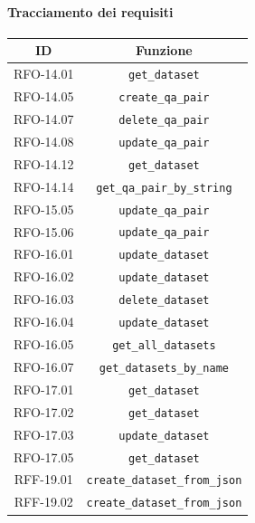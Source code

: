 \paragraph{Tracciamento dei requisiti}
\begin{tabularx}{\textwidth}{|c|c|}
    \hline
    \textbf{ID} & \textbf{Funzione} \\
    \hline
    RFO-14.01 & \texttt{get\_dataset}\\
    \hline
    RFO-14.05 & \texttt{create\_qa\_pair}\\
    \hline
    RFO-14.07 & \texttt{delete\_qa\_pair}\\
    \hline
    RFO-14.08 & \texttt{update\_qa\_pair}\\
    \hline
    RFO-14.12 & \texttt{get\_dataset}\\
    \hline
    RFO-14.14 & \texttt{get\_qa\_pair\_by\_string}\\
    \hline
    RFO-15.05 & \texttt{update\_qa\_pair}\\
    \hline
    RFO-15.06 & \texttt{update\_qa\_pair}\\
    \hline
    RFO-16.01 & \texttt{update\_dataset}\\
    \hline
    RFO-16.02 & \texttt{update\_dataset}\\
    \hline
    RFO-16.03 & \texttt{delete\_dataset}\\
    \hline
    RFO-16.04 & \texttt{update\_dataset}\\
    \hline
    RFO-16.05 & \texttt{get\_all\_datasets}\\
    \hline
    RFO-16.07 & \texttt{get\_datasets\_by\_name}\\
    \hline
    RFO-17.01 & \texttt{get\_dataset}\\
    \hline
    RFO-17.02 & \texttt{get\_dataset}\\
    \hline
    RFO-17.03 & \texttt{update\_dataset}\\
    \hline
    RFO-17.05 & \texttt{get\_dataset}\\
    \hline
    RFF-19.01 & \texttt{create\_dataset\_from\_json}\\
    \hline
    RFF-19.02 & \texttt{create\_dataset\_from\_json}\\
    \hline
\end{tabularx}

















